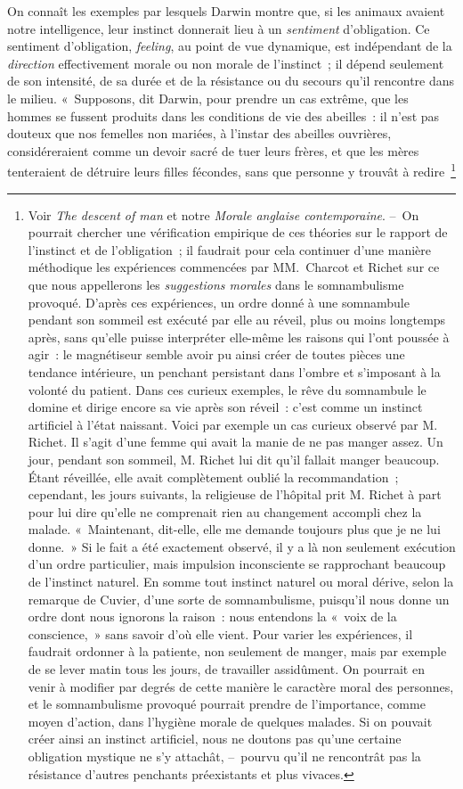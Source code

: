 \documentclass[french,twoside]{book} %
\begin{document}
On connaît les exemples par lesquels Darwin montre que, si les animaux avaient notre intelligence, leur instinct donnerait lieu à un \emph{sentiment} d’obligation. Ce sentiment d’obligation, \emph{feeling}, au point de vue dynamique, est indépendant de la \emph{direction} effectivement morale ou non morale de l’instinct ; il dépend seulement de son intensité, de sa durée et de la résistance ou du secours qu’il rencontre dans le milieu. « Supposons, dit Darwin, pour prendre un cas extrême, que les hommes se fussent produits dans les conditions de vie des abeilles : il n’est pas douteux que nos femelles non mariées, à l’instar des abeilles ouvrières, considéreraient comme un devoir sacré de tuer leurs frères, et que les mères tenteraient de détruire leurs filles fécondes, sans que personne y trouvât à redire \footnote{ \noindent Voir \emph{The descent of man} et notre \emph{Morale anglaise contemporaine}. – On pourrait chercher une vérification empirique de ces théories sur le rapport de l’instinct et de l’obligation ; il faudrait pour cela continuer d’une manière méthodique les expériences commencées par MM. Charcot et Richet sur ce que nous appellerons les \emph{suggestions morales} dans le somnambulisme provoqué. D’après ces expériences, un ordre donné à une somnambule pendant son sommeil est exécuté par elle au réveil, plus ou moins longtemps après, sans qu’elle puisse interpréter elle-même les raisons qui l’ont poussée à agir : le magnétiseur semble avoir pu ainsi créer de toutes pièces une tendance intérieure, un penchant persistant dans l’ombre et s’imposant à la volonté du patient. Dans ces curieux exemples, le rêve du somnambule le domine et dirige encore sa vie après son réveil : c’est comme un instinct artificiel à l’état naissant. Voici par exemple un cas curieux observé par M. Richet. Il s’agit d’une femme qui avait la manie de ne pas manger assez. Un jour, pendant son sommeil, M. Richet lui dit qu’il fallait manger beaucoup. Étant réveillée, elle avait complètement oublié la recommandation ; cependant, les jours suivants, la religieuse de l’hôpital prit M. Richet à part pour lui dire qu’elle ne comprenait rien au changement accompli chez la malade. « Maintenant, dit-elle, elle me demande toujours plus que je ne lui donne. » Si le fait a été exactement observé, il y a là non seulement exécution d’un ordre particulier, mais impulsion inconsciente se rapprochant beaucoup de l’instinct naturel. En somme tout instinct naturel ou moral dérive, selon la remarque de Cuvier, d’une sorte de somnambulisme, puisqu’il nous donne un ordre dont nous ignorons la raison : nous entendons la « voix de la conscience, » sans savoir d’où elle vient. Pour varier les expériences, il faudrait ordonner à la patiente, non seulement de manger, mais par exemple de se lever matin tous les jours, de travailler assidûment. On pourrait en venir à modifier par degrés de cette manière le caractère moral des personnes, et le somnambulisme provoqué pourrait prendre de l’importance, comme moyen d’action, dans l’hygiène morale de quelques malades. Si on pouvait créer ainsi an instinct artificiel, nous ne doutons pas qu’une certaine obligation mystique ne s’y attachât, – pourvu qu’il ne rencontrât pas la résistance d’autres penchants préexistants et plus vivaces.\par
}
\end{document}
